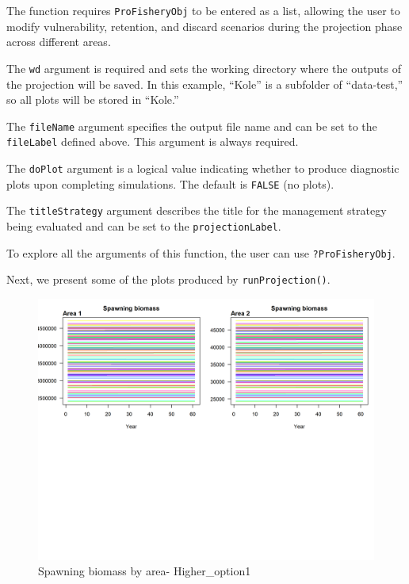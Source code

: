 \documentclass[
]{book}
\begin{document}
The function requires \texttt{ProFisheryObj} to be entered as a list, allowing the user to modify vulnerability, retention, and discard scenarios during the projection phase across different areas.

The \texttt{wd} argument is required and sets the working directory where the outputs of the projection will be saved. In this example, ``Kole'' is a subfolder of ``data-test,'' so all plots will be stored in ``Kole.''

The \texttt{fileName} argument specifies the output file name and can be set to the \texttt{fileLabel} defined above. This argument is always required.

The \texttt{doPlot} argument is a logical value indicating whether to produce diagnostic plots upon completing simulations. The default is \texttt{FALSE} (no plots).

The \texttt{titleStrategy} argument describes the title for the management strategy being evaluated and can be set to the \texttt{projectionLabel}.

To explore all the arguments of this function, the user can use \texttt{?ProFisheryObj}.

Next, we present some of the plots produced by \texttt{runProjection()}.

\begin{figure}
\includegraphics[width=1\linewidth]{data-test/Kole/Higher_option1_SB_Area} \caption{Spawning biomass by area- Higher_option1 }\label{fig:fig-SB-H-opt1}
\end{figure}
\end{document}
